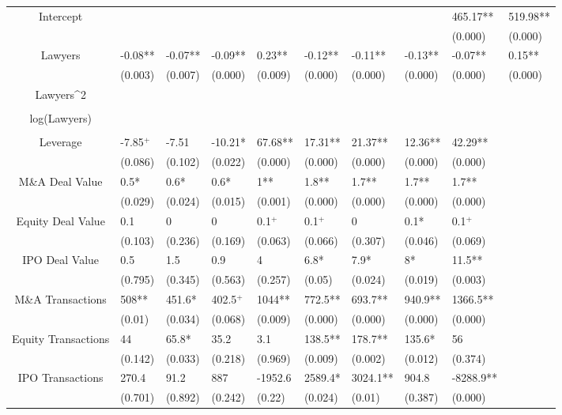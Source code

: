 \documentclass{article}
\begin{document}
\begin{table}[H]
\begin{tabular}{|clllllllll|}
Intercept &  &  &  &  &  &  &  & 465.17** & 519.98** \\ 
   &  &  &  &  &  &  &  & (0.000) & (0.000) \\ 
  Lawyers & -0.08** & -0.07** & -0.09** & 0.23** & -0.12** & -0.11** & -0.13** & -0.07** & 0.15** \\ 
   & (0.003) & (0.007) & (0.000) & (0.009) & (0.000) & (0.000) & (0.000) & (0.000) & (0.000) \\ 
  Lawyers^2 &  &  &  &  &  &  &  &  &  \\ 
   &  &  &  &  &  &  &  &  &  \\ 
  log(Lawyers) &  &  &  &  &  &  &  &  &  \\ 
   &  &  &  &  &  &  &  &  &  \\ 
  Leverage & -7.85$^{+}$ & -7.51 & -10.21* & 67.68** & 17.31** & 21.37** & 12.36** & 42.29** &  \\ 
   & (0.086) & (0.102) & (0.022) & (0.000) & (0.000) & (0.000) & (0.000) & (0.000) &  \\ 
  M\&A Deal Value & 0.5* & 0.6* & 0.6* & 1** & 1.8** & 1.7** & 1.7** & 1.7** &  \\ 
   & (0.029) & (0.024) & (0.015) & (0.001) & (0.000) & (0.000) & (0.000) & (0.000) &  \\ 
  Equity Deal Value & 0.1 & 0 & 0 & 0.1$^{+}$ & 0.1$^{+}$ & 0 & 0.1* & 0.1$^{+}$ &  \\ 
   & (0.103) & (0.236) & (0.169) & (0.063) & (0.066) & (0.307) & (0.046) & (0.069) &  \\ 
  IPO Deal Value & 0.5 & 1.5 & 0.9 & 4 & 6.8* & 7.9* & 8* & 11.5** &  \\ 
   & (0.795) & (0.345) & (0.563) & (0.257) & (0.05) & (0.024) & (0.019) & (0.003) &  \\ 
  M\&A Transactions & 508** & 451.6* & 402.5$^{+}$ & 1044** & 772.5** & 693.7** & 940.9** & 1366.5** &  \\ 
   & (0.01) & (0.034) & (0.068) & (0.009) & (0.000) & (0.000) & (0.000) & (0.000) &  \\ 
  Equity Transactions & 44 & 65.8* & 35.2 & 3.1 & 138.5** & 178.7** & 135.6* & 56 &  \\ 
   & (0.142) & (0.033) & (0.218) & (0.969) & (0.009) & (0.002) & (0.012) & (0.374) &  \\ 
  IPO Transactions & 270.4 & 91.2 & 887 & -1952.6 & 2589.4* & 3024.1** & 904.8 & -8288.9** &  \\ 
   & (0.701) & (0.892) & (0.242) & (0.22) & (0.024) & (0.01) & (0.387) & (0.000) &  \\ 

\end{tabular}
\end{table}
\end{document}
